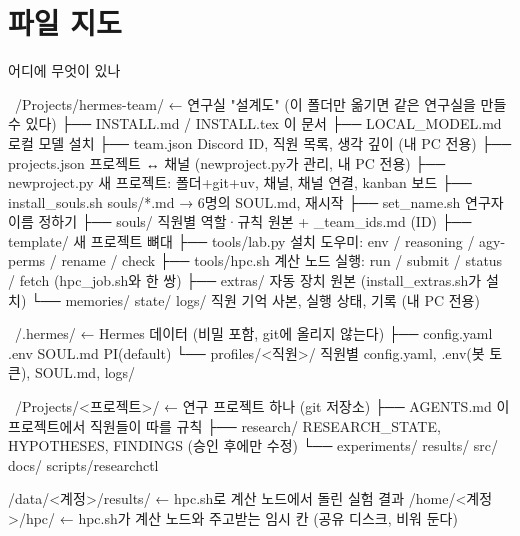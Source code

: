 \documentclass[10pt,a4paper,oneside]{report}
\begin{document}
\section{파일 지도}
\begin{filebox}{어디에 무엇이 있나}
\begin{code}
~/Projects/hermes-team/          ← 연구실 "설계도" (이 폴더만 옮기면 같은 연구실을 만들 수 있다)
├── INSTALL.md / INSTALL.tex     이 문서
├── LOCAL_MODEL.md               로컬 모델 설치
├── team.json                    Discord ID, 직원 목록, 생각 깊이 (내 PC 전용)
├── projects.json                프로젝트 ↔ 채널 (newproject.py가 관리, 내 PC 전용)
├── newproject.py                새 프로젝트: 폴더+git+uv, 채널, 채널 연결, kanban 보드
├── install_souls.sh             souls/*.md → 6명의 SOUL.md, 재시작
├── set_name.sh                  연구자 이름 정하기
├── souls/                       직원별 역할·규칙 원본 + _team_ids.md (ID)
├── template/                    새 프로젝트 뼈대
├── tools/lab.py                 설치 도우미: env / reasoning / agy-perms / rename / check
├── tools/hpc.sh                 계산 노드 실행: run / submit / status / fetch (hpc_job.sh와 한 쌍)
├── extras/                      자동 장치 원본 (install_extras.sh가 설치)
└── memories/ state/ logs/       직원 기억 사본, 실행 상태, 기록 (내 PC 전용)

~/.hermes/                       ← Hermes 데이터 (비밀 포함, git에 올리지 않는다)
├── config.yaml  .env  SOUL.md   PI(default)
└── profiles/<직원>/             직원별 config.yaml, .env(봇 토큰), SOUL.md, logs/

~/Projects/<프로젝트>/           ← 연구 프로젝트 하나 (git 저장소)
├── AGENTS.md                    이 프로젝트에서 직원들이 따를 규칙
├── research/                    RESEARCH_STATE, HYPOTHESES, FINDINGS (승인 후에만 수정)
└── experiments/ results/ src/ docs/ scripts/researchctl

/data/<계정>/results/    ← hpc.sh로 계산 노드에서 돌린 실험 결과
/home/<계정>/hpc/                ← hpc.sh가 계산 노드와 주고받는 임시 칸 (공유 디스크, 비워 둔다)
\end{code}
\end{filebox}
\end{document}
